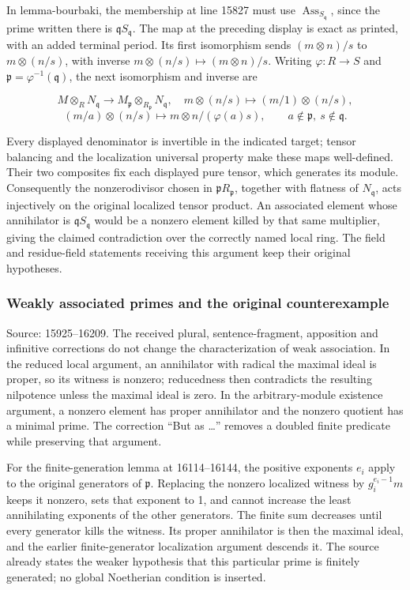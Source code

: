 In lemma-bourbaki, the membership at line 15827 must use \(\operatorname{Ass}_{S_{\mathfrak q}}\), since the prime written there is \(\mathfrak qS_{\mathfrak q}\). The map at the preceding display is exact as printed, with an added terminal period. Its first isomorphism sends \((m\otimes n)/s\) to \(m\otimes(n/s)\), with inverse \(m\otimes(n/s)\mapsto(m\otimes n)/s\). Writing \(\varphi:R\to S\) and \(\mathfrak p=\varphi^{-1}(\mathfrak q)\), the next isomorphism and inverse are

\[
M\otimes_RN_{\mathfrak q}\longrightarrow
 M_{\mathfrak p}\otimes_{R_{\mathfrak p}}N_{\mathfrak q},
\quad m\otimes(n/s)\longmapsto(m/1)\otimes(n/s),
\] \[
(m/a)\otimes(n/s)\longmapsto m\otimes n/(\varphi(a)s),
\qquad a\notin\mathfrak p,\ s\notin\mathfrak q.
\]

Every displayed denominator is invertible in the indicated target; tensor balancing and the localization universal property make these maps well-defined. Their two composites fix each displayed pure tensor, which generates its module. Consequently the nonzerodivisor chosen in \(\mathfrak pR_{\mathfrak p}\), together with flatness of \(N_{\mathfrak q}\), acts injectively on the original localized tensor product. An associated element whose annihilator is \(\mathfrak qS_{\mathfrak q}\) would be a nonzero element killed by that same multiplier, giving the claimed contradiction over the correctly named local ring. The field and residue-field statements receiving this argument keep their original hypotheses.

\subsubsection{Weakly associated primes and the original counterexample}\label{weakly-associated-primes-and-the-original-counterexample}

Source: 15925--16209. The received plural, sentence-fragment, apposition and infinitive corrections do not change the characterization of weak association. In the reduced local argument, an annihilator with radical the maximal ideal is proper, so its witness is nonzero; reducedness then contradicts the resulting nilpotence unless the maximal ideal is zero. In the arbitrary-module existence argument, a nonzero element has proper annihilator and the nonzero quotient has a minimal prime. The correction ``But as \ldots'' removes a doubled finite predicate while preserving that argument.

For the finite-generation lemma at 16114--16144, the positive exponents \(e_i\) apply to the original generators of \(\mathfrak p\). Replacing the nonzero localized witness by \(g_i^{e_i-1}m\) keeps it nonzero, sets that exponent to 1, and cannot increase the least annihilating exponents of the other generators. The finite sum decreases until every generator kills the witness. Its proper annihilator is then the maximal ideal, and the earlier finite-generator localization argument descends it. The source already states the weaker hypothesis that this particular prime is finitely generated; no global Noetherian condition is inserted.

